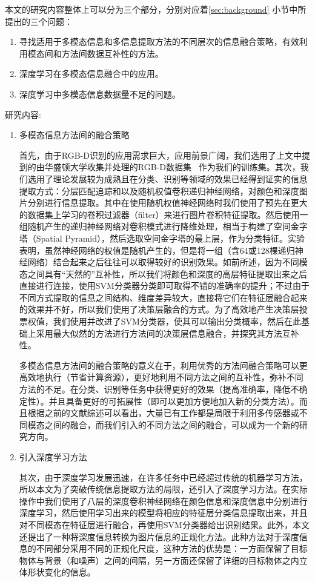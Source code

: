 本文的研究内容整体上可以分为三个部分，分别对应着\ref{sec:background} 小节中所提出的三个问题：
\begin{enumerate}
  \item 寻找适用于多模态信息和多信息提取方法的不同层次的信息融合策略，有效利用模态间和方法间数据互补性的方法。
  \item 深度学习在多模态信息融合中的应用。
  \item 深度学习中多模态信息数据量不足的问题。
\end{enumerate}

研究内容:

\begin{enumerate}
\item 多模态信息方法间的融合策略

首先，由于RGB-D识别的应用需求巨大，应用前景广阔，我们选用了上文中提到的由华盛顿大学收集并处理的RGB-D数据集~ 作为我们的训练集。其次，我们选用了理论发展较为成熟且在分类、识别等领域的效果已经得到证实的信息提取方式：分层匹配追踪和以及随机权值卷积递归神经网络，对颜色和深度图片分别进行信息提取。其中在使用随机权值神经网络时我们使用了预先在更大的数据集上学习的卷积过滤器（filter）来进行图片卷积特征提取。然后使用一组随机产生的递归神经网络对卷积模式进行降维处理，相当于构建了空间金字塔（Spatial Pyramid），然后选取空间金字塔的最上层，作为分类特征。实验表明，虽然神经网络的权值是随机产生的，但是将一组（含64或128棵递归神经网络）结合起来之后往往可以取得较好的识别效果。如前所述，因为不同模态之间具有“天然的”互补性，所以我们将颜色和深度的高层特征提取出来之后直接进行连接，使用SVM分类器分类即可取得不错的准确率的提升；不过由于不同方式提取的信息之间结构、维度差异较大，直接将它们在特征层融合起来的效果并不好，所以我们使用了决策层融合的方式。为了高效地产生决策层投票权值，我们使用并改进了SVM分类器，使其可以输出分类概率，然后在此基础上采用最大似然的方法进行方法间的决策层信息融合，并探究其方法互补性。

多模态信息方法间的融合策略的意义在于，利用优秀的方法间融合策略可以更高效地执行（节省计算资源），更好地利用不同方法之间的互补性，弥补不同方法的不足。在分类、识别等任务中获得更好的效果（提高准确率，降低不确定性）。并且具备更好的可拓展性（即可以更加方便地加入新的分类方法）。而且根据之前的文献综述可以看出，大量已有工作都是局限于利用多传感器或不同模态之间的融合，而我们引入的不同方法之间的融合，可以成为一个新的研究方向。

\item 引入深度学习方法

其次，由于深度学习发展迅速，在许多任务中已经超过传统的机器学习方法，所以本文为了突破传统信息提取方法的局限，还引入了深度学习方法。在实际操作中我们使用了八层的深度卷积神经网络在颜色信息和深度信息中分别进行深度学习，然后使用学习出来的模型将相应的特征层分类信息提取出来，并且对不同模态在特征层进行融合，再使用SVM分类器给出识别结果。此外，本文还提出了一种将深度信息转换为图片信息的正规化方法。此种方法对于深度信息的不同部分采用不同的正规化尺度，这种方法的优势是：一方面保留了目标物体与背景（和噪声）之间的间隔，另一方面还保留了详细的目标物体之内立体形状变化的信息。


\end{enumerate}
